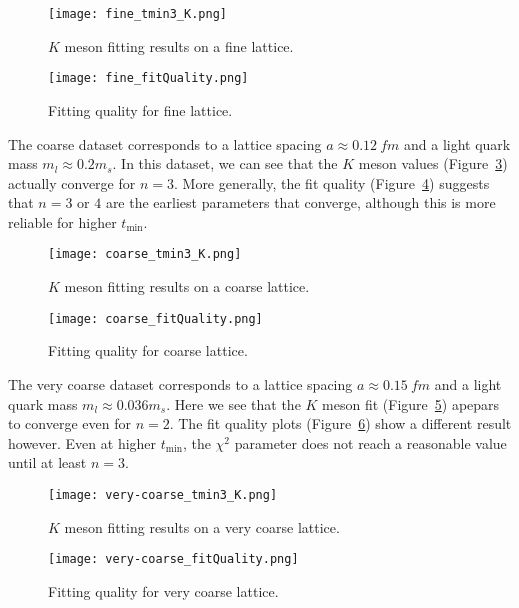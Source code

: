 \documentclass[a4paper,12pt]{article}
\begin{document}
\begin{figure}[p]
    \centering
    \texttt{[image: fine\_tmin3\_K.png]}
    \caption{$K$ meson fitting results on a fine lattice.\label{fig:fit_fine_K}}
\end{figure}

\begin{figure}[p]
    \centering
    \texttt{[image: fine\_fitQuality.png]}
    \caption{Fitting quality for fine lattice.\label{fig:fit_fine_qual}}
\end{figure}

\bigskip
The coarse dataset corresponds to a lattice spacing $a \approx \SI{0.12}{fm}$ and a light quark mass $m_l \approx 0.2 m_s$. In this dataset, we can see that the $K$ meson values (Figure~\ref{fig:fit_coarse_K}) actually converge for $n=3$. More generally, the fit quality (Figure~\ref{fig:fit_coarse_qual}) suggests that $n = 3$ or $4$ are the earliest parameters that converge, although this is more reliable for higher $t_\mathrm{min}$.

\begin{figure}[p]
    \centering
    \texttt{[image: coarse\_tmin3\_K.png]}
    \caption{$K$ meson fitting results on a coarse lattice.\label{fig:fit_coarse_K}}
\end{figure}

\begin{figure}[p]
    \centering
    \texttt{[image: coarse\_fitQuality.png]}
    \caption{Fitting quality for coarse lattice.\label{fig:fit_coarse_qual}}
\end{figure}

\bigskip
The very coarse dataset corresponds to a lattice spacing $a \approx \SI{0.15}{fm}$ and a light quark mass $m_l \approx 0.036m_s$. Here we see that the $K$ meson fit (Figure~\ref{fig:fit_very-coarse_K}) apepars to converge even for $n=2$. The fit quality plots (Figure~\ref{fig:fit_very-coarse_qual}) show a different result however. Even at higher $t_\mathrm{min}$, the $\chi^2$ parameter does not reach a reasonable value until at least $n=3$.

\begin{figure}[p]
    \centering
    \texttt{[image: very-coarse\_tmin3\_K.png]}
    \caption{$K$ meson fitting results on a very coarse lattice.\label{fig:fit_very-coarse_K}}
\end{figure}

\begin{figure}[p]
    \centering
    \texttt{[image: very-coarse\_fitQuality.png]}
    \caption{Fitting quality for very coarse lattice.\label{fig:fit_very-coarse_qual}}
\end{figure}
\end{document}
